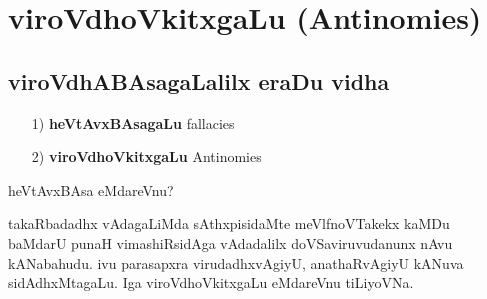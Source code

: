 \chapter{viroVdhoVkitxgaLu (\rm Antinomies)}

\section*{viroVdhABAsagaLalilx eraDu vidha}
\begin{itemize}
\item[{\rm 1)}] {\bf heVtAvxBAsagaLu} {\rm fallacies}
\item[{\rm 2)}] {\bf viroVdhoVkitxgaLu} {\rm Antinomies}
\end{itemize}

heVtAvxBAsa eMdareVnu?

takaRbadadhx vAdagaLiMda sAthxpisidaMte meVlfnoVTakekx kaMDu baMdarU punaH vimashiRsidAga vAdadalilx doVSaviruvudanunx nAvu kANabahudu. ivu parasapxra virudadhxvAgiyU, anathaRvAgiyU kANuva sidAdhxMtagaLu. Iga viroVdhoVkitxgaLu eMdareVnu tiLiyoVNa.

